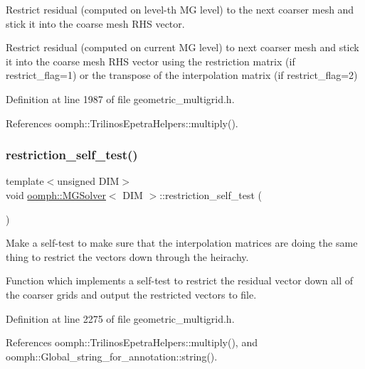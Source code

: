 Restrict residual (computed on level-\/th MG level) to the next coarser mesh and stick it into the coarse mesh R\+HS vector. 

Restrict residual (computed on current MG level) to next coarser mesh and stick it into the coarse mesh R\+HS vector using the restriction matrix (if restrict\+\_\+flag=1) or the transpose of the interpolation matrix (if restrict\+\_\+flag=2) 

Definition at line 1987 of file geometric\+\_\+multigrid.\+h.



References oomph\+::\+Trilinos\+Epetra\+Helpers\+::multiply().

\mbox{\label{classoomph_1_1MGSolver_acfc50241a9dc27e7e60b06564e5dd726}} 
\subsubsection{\texorpdfstring{restriction\+\_\+self\+\_\+test()}{restriction\_self\_test()}}
{\footnotesize\ttfamily template$<$unsigned D\+IM$>$ \\
void \hyperlink{classoomph_1_1MGSolver}{oomph\+::\+M\+G\+Solver}$<$ D\+IM $>$\+::restriction\+\_\+self\+\_\+test (\begin{DoxyParamCaption}{ }\end{DoxyParamCaption})}



Make a self-\/test to make sure that the interpolation matrices are doing the same thing to restrict the vectors down through the heirachy. 

Function which implements a self-\/test to restrict the residual vector down all of the coarser grids and output the restricted vectors to file. 

Definition at line 2275 of file geometric\+\_\+multigrid.\+h.



References oomph\+::\+Trilinos\+Epetra\+Helpers\+::multiply(), and oomph\+::\+Global\+\_\+string\+\_\+for\+\_\+annotation\+::string().

\mbox{\label{classoomph_1_1MGSolver_a88efa5f110e824947f50306e3b56e07b}} 
